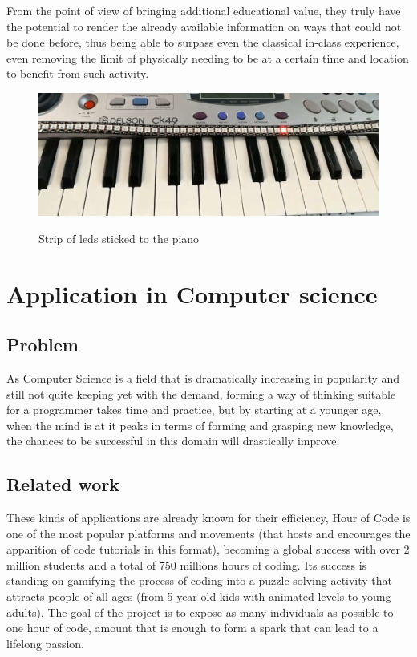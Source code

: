 \documentclass[12 pct]{report}
\begin{document}
From the point of view of bringing additional educational value, they truly have the potential to render the already available information on ways that could not be done before, thus being able to surpass even the classical in-class experience, even removing the limit of physically needing to be at a certain  time and location to benefit from such activity.
\begin{figure}[]
\includegraphics[width=1.0\textwidth]{piano-leds}
\centering
\label{fig:feature-points}
\caption{Strip of leds sticked to the piano}
\end{figure}


\chapter{Application in Computer science}

\section{Problem}
As Computer Science is a field that is dramatically increasing in popularity and still not quite keeping yet with the demand, forming a way of thinking suitable for a programmer takes time and practice, but by starting at a younger age, when the mind is at it peaks in terms of forming and grasping new knowledge, the chances to be successful in this domain will drastically improve.


\section{Related work}
These kinds of applications are already known for their efficiency, Hour of Code is one of the most popular platforms and movements (that hosts and encourages the apparition of code tutorials in this format), becoming a global success with over 2 million students and a total of 750 millions hours of coding. Its success is standing on gamifying the process of coding into a puzzle-solving activity that attracts people of all ages (from 5-year-old kids with animated levels to young adults). The goal of the project is to expose as many individuals as possible to one hour of code, amount that is enough to form a spark that can lead to a lifelong passion.
\end{document}
